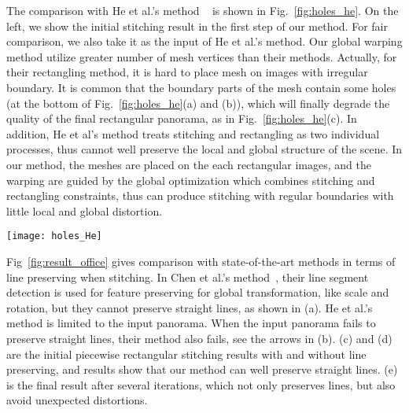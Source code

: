 \documentclass[10pt,journal,compsoc]{IEEEtran}
\begin{document}
The comparison with He et al.'s method ~\cite{journals/tog/HeC013} is shown in Fig.~\ref{fig:holes_he}. On the left, we show the initial stitching result in the first step of our method. For fair comparison, we also take it as the input of He et al.'s method. Our global warping method utilize greater number of mesh vertices than their methods.
Actually, for their rectangling method, it is hard to place mesh on images with irregular boundary. It is common that the boundary parts of the mesh contain some holes (at the bottom of Fig.~\ref{fig:holes_he}(a) and (b)), which will finally degrade the quality of the final rectangular panorama, as in Fig.~\ref{fig:holes_he}(c). In addition, He et al's method treats stitching and rectangling as two individual processes, thus cannot well preserve the local and global structure of the scene. In our method, the meshes are placed on the each rectangular images, and the warping are guided by the global optimization which combines stitching and rectangling constraints, thus can produce stitching with regular boundaries with little local and global distortion.

 \begin{figure*} %
  \centering
  \texttt{[image: holes\_He]}
  \caption{Comparison with He et al.'s method~\cite{journals/tog/HeC013}. The initial stitching is the first step of our method, which is also the input of He et al.'s method~\cite{journals/tog/HeC013}. For He et al.'s method: (a) mesh of on the input image; (b) mesh after global warping; (c) final rectangular panorama.
  For our method: (d) meshes of our initial stitching; (e) meshes after the global warping; (f) our rectangular panorama.} \label{fig:holes_he}
\end{figure*}

Fig~\ref{fig:result_office} gives comparison with state-of-the-art methods in terms of line preserving when stitching. In Chen et al.'s method~\cite{conf/eccv/ChenC16}, their line segment detection is used for feature preserving for global transformation, like scale and rotation, but they cannot preserve straight lines, as shown in (a). He et al.'s method is limited to the input panorama. When the input panorama fails to preserve straight lines, their method also fails, see the arrows in (b). (c) and (d) are the initial piecewise rectangular stitching results with and without line preserving, and results show that our method can well preserve straight lines. (e) is the final result after several iterations, which not only preserves lines, but also avoid unexpected distortions.
\end{document}
